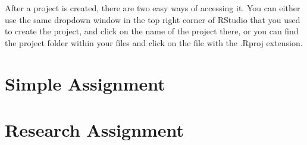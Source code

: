 \documentclass[
]{article}
\begin{document}
After a project is created, there are two easy ways of accessing it. You
can either use the same dropdown window in the top right corner of
RStudio that you used to create the project, and click on the name of
the project there, or you can find the project folder within your files
and click on the file with the .Rproj extension.

\hfill\break

\hypertarget{simple-assignment}{%
\section{Simple Assignment}\label{simple-assignment}}

\hypertarget{research-assignment}{%
\section{Research Assignment}\label{research-assignment}}
\end{document}
